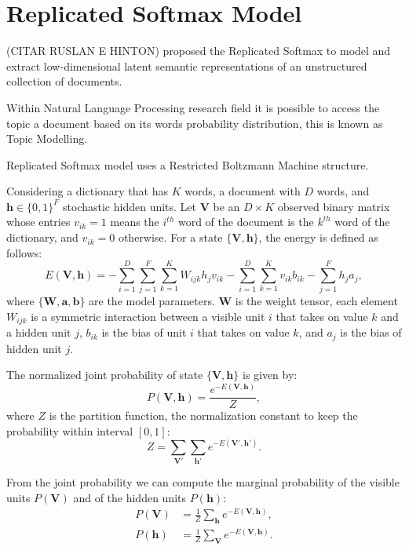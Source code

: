 \section{Replicated Softmax Model}%
\label{app:rsm}%

(CITAR RUSLAN E HINTON) proposed the Replicated Softmax to model and extract low-dimensional latent semantic representations of an unstructured collection of documents.

Within Natural Language Processing research field it is possible to access the topic a document based on its words probability distribution, this is known as Topic Modelling.

Replicated Softmax model uses a Restricted Boltzmann Machine structure.

Considering a dictionary that has $K$ words, a document with $D$ words, and $\mathbf{h} \in {\{0, 1\}}^{F}$ stochastic hidden units. 
Let $\mathbf{V}$ be an $D \times K$ observed binary matrix whose entries $v_{ik} = 1$ means the $i^{th}$ word of the document is the $k^{th}$ word of the dictionary, and $v_{ik} = 0$ otherwise.
For a state ${\{\mathbf{V}, \mathbf{h}\}}$, the energy is defined as follows:
\begin{equation}
    \label{eq:app:rsm-energy-Vh}
    E(\mathbf{V}, \mathbf{h}) = - \sum^{D}_{i = 1} \sum^{F}_{j = 1} \sum^{K}_{k = 1} W_{ijk} h_{j} v_{ik} - \sum^{D}_{i = 1} \sum^{K}_{k = 1} v_{ik} b_{ik} - \sum^{F}_{j = 1} h_{j} a_{j},
\end{equation}
where ${\{\mathbf{W}, \mathbf{a}, \mathbf{b}\}}$ are the model parameters.
$\mathbf{W}$ is the weight tensor, each element $W_{ijk}$ is a symmetric interaction between a visible unit $i$ that takes on value $k$ and a hidden unit $j$, $b_{ik}$ is the bias of unit $i$ that takes on value $k$, and $a_{j}$ is the bias of hidden unit $j$.

The normalized joint probability of state ${\{\mathbf{V}, \mathbf{h}\}}$ is given by:
\begin{equation}
    \label{eq:app:rsm-joint-prob}
    P(\mathbf{V}, \mathbf{h}) = \frac{e^{-E(\mathbf{V}, \mathbf{h})}}{Z},
\end{equation}
where $Z$ is the partition function, the normalization constant to keep the probability within interval $[0, 1]$:
\begin{equation}
    \label{eq:app:rsm-partition-func}
    Z = \sum_{\mathbf{V}'} \sum_{\mathbf{h}'} e^{-E(\mathbf{V}', \mathbf{h}')}.
\end{equation}

From the joint probability we can compute the marginal probability of the visible units $P(\mathbf{V})$ and of the hidden units $P(\mathbf{h})$:
\begin{align}
    \label{eq:app:rsm-marg-prob-visible}
    P(\mathbf{V}) &= \frac{1}{Z} \sum_{\mathbf{h}} e^{-E(\mathbf{V}, \mathbf{h})}, \\
    P(\mathbf{h}) &= \frac{1}{Z} \sum_{\mathbf{V}} e^{-E(\mathbf{V}, \mathbf{h})}.
\end{align}

%




